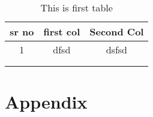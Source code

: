 
  

\frontmatter

\mainmatter
\begin{table}
\caption{This is first table}
\label{tb:firsttable}
\centering
\begin{tabular}{|c|c|c|} 
	\hline
 sr no	& first col  & Second Col  \\ \hline
1	& dfsd &dsfsd  \\ 
	&  &  \\ 
	&  & 
	\hline
\end{tabular} 
\end{table}

 
                     


\chapter*{Appendix}

%
%







 
